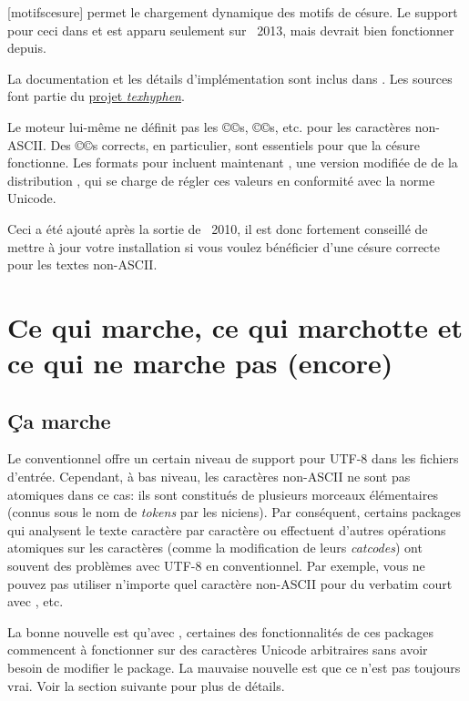 \documentclass{lltxdoc}
\begin{document}
[motifscesure]
\luatex permet le chargement dynamique des motifs de césure. Le support pour ceci
dans  et  est apparu seulement sur \texlive{}~2013,
mais devrait bien fonctionner depuis.

La documentation et les détails d'implémentation sont inclus dans .
Les sources font partie du \href{http://tug.org/tex-hyphen/}{projet \emph{texhyphen}}.

Le moteur lui-même ne définit pas les ©\catcode©s, ©\lccode©s, etc. pour les
caractères non-ASCII. Des ©\lccode©s corrects, en particulier, sont essentiels
pour que la césure fonctionne. Les formats pour \luatex incluent maintenant
, une version modifiée de 
de la distribution \xetex, qui se charge de régler ces valeurs en conformité avec
la norme Unicode.

Ceci a été ajouté après la sortie de \texlive{}~2010, il est donc fortement conseillé
de mettre à jour votre installation si vous voulez bénéficier d'une césure correcte
pour les textes non-ASCII.


\section{Ce qui marche, ce qui marchotte et ce qui ne marche pas (encore)}\label{workornot}

\subsection{Ça marche}\label{working}

Le \latex conventionnel offre un certain niveau de support pour UTF-8 dans
les fichiers d'entrée. Cependant, à bas niveau, les caractères non-ASCII
ne sont pas atomiques dans ce cas: ils sont constitués de plusieurs morceaux
élémentaires (connus sous le nom de \emph{tokens} par les \tex{}niciens).
Par conséquent, certains packages qui analysent le texte caractère par caractère
ou effectuent d'autres opérations atomiques sur les caractères (comme la
modification de leurs \emph{catcodes}) ont souvent des problèmes avec UTF-8
en \latex conventionnel. Par exemple, vous ne pouvez pas utiliser n'importe
quel caractère non-ASCII pour du verbatim court avec , etc.

La bonne nouvelle est qu'avec \lualatex, certaines des fonctionnalités de ces packages
commencent à fonctionner sur des caractères Unicode arbitraires sans avoir besoin de
modifier le package. La mauvaise nouvelle est que ce n'est pas toujours vrai.
Voir la section suivante pour plus de détails.
\end{document}
